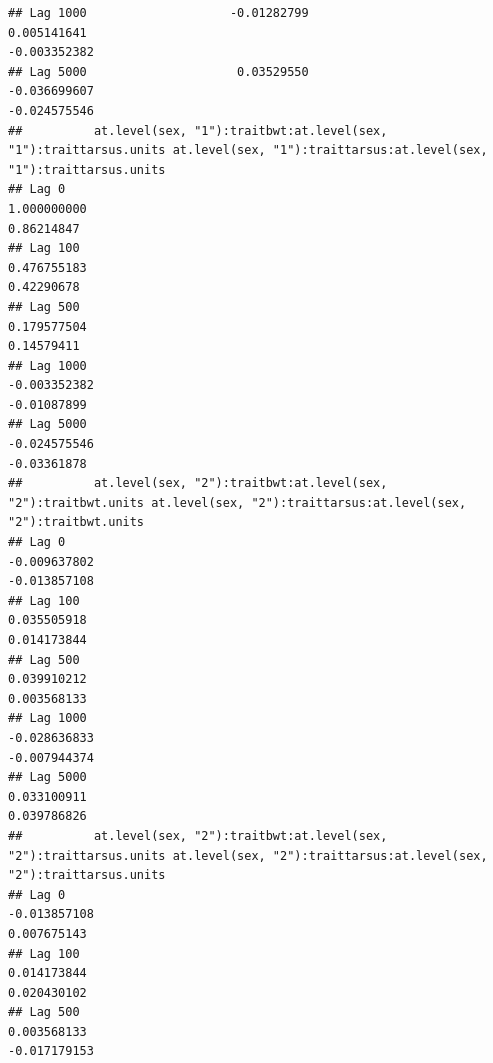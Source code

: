 \documentclass[
  12pt,
]{book}
\begin{document}
\begin{verbatim}
## Lag 1000                    -0.01282799                                                   0.005141641                                                     -0.003352382
## Lag 5000                     0.03529550                                                  -0.036699607                                                     -0.024575546
##          at.level(sex, "1"):traitbwt:at.level(sex, "1"):traittarsus.units at.level(sex, "1"):traittarsus:at.level(sex, "1"):traittarsus.units
## Lag 0                                                         1.000000000                                                          0.86214847
## Lag 100                                                       0.476755183                                                          0.42290678
## Lag 500                                                       0.179577504                                                          0.14579411
## Lag 1000                                                     -0.003352382                                                         -0.01087899
## Lag 5000                                                     -0.024575546                                                         -0.03361878
##          at.level(sex, "2"):traitbwt:at.level(sex, "2"):traitbwt.units at.level(sex, "2"):traittarsus:at.level(sex, "2"):traitbwt.units
## Lag 0                                                     -0.009637802                                                     -0.013857108
## Lag 100                                                    0.035505918                                                      0.014173844
## Lag 500                                                    0.039910212                                                      0.003568133
## Lag 1000                                                  -0.028636833                                                     -0.007944374
## Lag 5000                                                   0.033100911                                                      0.039786826
##          at.level(sex, "2"):traitbwt:at.level(sex, "2"):traittarsus.units at.level(sex, "2"):traittarsus:at.level(sex, "2"):traittarsus.units
## Lag 0                                                        -0.013857108                                                         0.007675143
## Lag 100                                                       0.014173844                                                         0.020430102
## Lag 500                                                       0.003568133                                                        -0.017179153

\end{verbatim}
\end{document}
